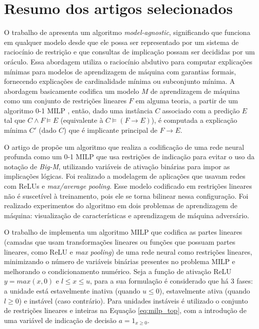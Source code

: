 \section{Resumo dos artigos selecionados}

O trabalho de  apresenta um algoritmo \textit{model-agnostic}, significando que funciona em qualquer modelo desde que ele possa ser representado por um sistema de raciocínio de restrição e que consultas de implicação possam ser decididas por um oráculo. Essa abordagem utiliza o raciocínio abdutivo para computar explicações mínimas para modelos de aprendizagem de máquina com garantias formais, fornecendo explicações de cardinalidade mínima ou subconjunto mínima. A abordagem basicamente codifica um modelo $M$ de aprendizagem de máquina como um conjunto de restrições lineares $F$ em alguma teoria, a partir de um algoritmo 0-1 MILP \cite{milp_01}, então, dado uma instância $C$ associado com a predição $E$ tal que $C \wedge F \models E$ (equivalente à $C \models (F \rightarrow E)$), é computada a explicação mínima $C'$ (dado $C$) que é implicante principal de  $F \rightarrow E$. 

O artigo de  propõe um algoritmo que realiza a codificação de uma rede neural profunda como um 0-1 MILP que usa restrições de indicação para evitar o uso da notação de \textit{Big-M}, utilizando variáveis de ativação binárias para impor as implicações lógicas. Foi realizado a modelagem de aplicações que usavam redes com ReLUs e \textit{max/average pooling}. Esse modelo codificado em restrições lineares não é suscetível à treinamento, pois ele se torna bilinear nessa configuração. Foi realizado experimentos do algoritmo em dois problemas de aprendizagem de máquina: visualização de características e aprendizagem de máquina adversário.

O trabalho de  implementa um algoritmo MILP que codifica as partes lineares (camadas que usam transformações lineares ou funções que possuam partes lineares, como ReLU e \textit{max pooling}) de uma rede neural como restrições lineares, minimizando o número de variáveis binárias presentes no problema MILP e melhorando o condicionamento numérico. Seja a função de ativação ReLU $y = max(x, 0)$ e $l \leq x \leq u$, para a sua formulação é considerado que há 3 fases: a unidade está estavelmente inativa (quando $u \leq 0$), estavelmente ativa (quando $l \geq 0$) e instável (caso contrário). Para unidades instáveis é utilizado o conjunto de restrições lineares e inteiras na Equação \ref{eq:milp_top}, com a introdução de uma variável de indicação de decisão $a = 1_{x \geq 0}$.

